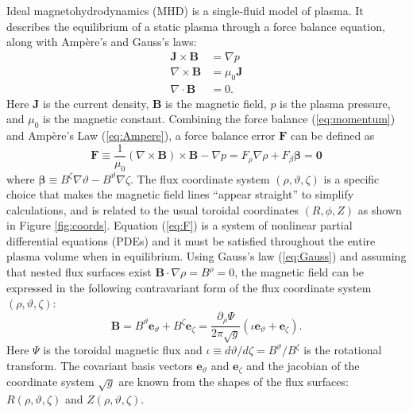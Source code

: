\documentclass{article}
\newcommand{\ev}{{\mathbf e}_{\vartheta}}
\newcommand{\ez}{{\mathbf e}_{\zeta}}
\begin{document}
Ideal magnetohydrodynamics (MHD) is a single-fluid model of plasma.
It describes the equilibrium of a static plasma through a force balance equation, along with Amp\`ere's and Gauss's laws:
%
\begin{subequations}
  \label{eq:equil}
  \begin{align}
    \label{eq:momentum}
    \mathbf{J} \times \mathbf{B} &= \nabla p \\
    \label{eq:Ampere}
    \nabla \times \mathbf{B} &= \mu_0 \mathbf{J} \\
    \label{eq:Gauss}
    \nabla \cdot \mathbf{B} &= 0.
  \end{align}
\end{subequations}
%
Here $\mathbf{J}$ is the current density, $\mathbf{B}$ is the magnetic field, $p$ is the plasma pressure, and $\mu_0$ is the magnetic constant.
Combining the force balance (\ref{eq:momentum}) and  Amp\`ere's Law (\ref{eq:Ampere}), a force balance error $\mathbf{F}$ can be defined as
%
\begin{equation}
  \label{eq:F}
  \mathbf{F} \equiv \frac{1}{\mu_0} \left( \nabla \times \mathbf{B} \right) \times \mathbf{B} - \nabla p = F_\rho \nabla\rho + F_\beta \mathbf{\beta} = \mathbf{0}
\end{equation}
%
where $\mathbf{\beta} \equiv B^\zeta \nabla \vartheta - B^\vartheta \nabla \zeta$.
The flux coordinate system $(\rho,\vartheta,\zeta)$ is a specific choice that makes the magnetic field lines ``appear straight'' to simplify calculations, and is related to the usual toroidal coordinates $(R,\phi,Z)$ as shown in Figure \ref{fig:coords}.
Equation (\ref{eq:F}) is a system of nonlinear partial differential equations (PDEs) and it must be satisfied throughout the entire plasma volume when in equilibrium.
Using Gauss's law (\ref{eq:Gauss}) and assuming that nested flux surfaces exist $\mathbf{B}\cdot\nabla\rho=B^\rho=0$, the magnetic field can be expressed in the following contravariant form of the flux coordinate system $(\rho,\vartheta,\zeta)$:
%
\begin{equation}
  \label{eq:B}
  \mathbf{B} = B^\vartheta \ev + B^\zeta \ez = \frac{\partial_\rho \Psi}{2\pi \sqrt{g}} \left( \iota \ev + \ez \right).
\end{equation}
%
Here $\Psi$ is the toroidal magnetic flux and $\iota\equiv d\vartheta/d\zeta = B^\vartheta/B^\zeta$ is the rotational transform.
The covariant basis vectors $\ev$ and $\ez$ and the jacobian of the coordinate system $\sqrt{g}$ are known from the shapes of the flux surfaces: $R(\rho,\vartheta,\zeta)$ and $Z(\rho,\vartheta,\zeta)$.
\end{document}
